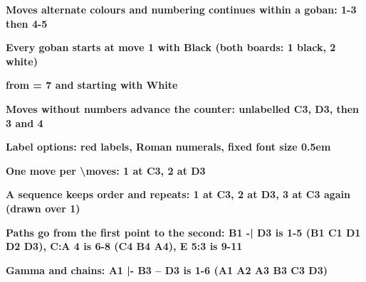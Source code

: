 \documentclass{article}
\newcommand\case[1]{\par\medskip\noindent\textbf{#1}\par\nopagebreak}
\begin{document}
\case{Moves alternate colours and numbering continues within a goban: 1-3 then 4-5}
\begin{goban}[5]\end{goban}

\case{Every goban starts at move 1 with Black (both boards: 1 black, 2 white)}
\begin{goban}[5]\end{goban}
\begin{goban}[5]\end{goban}

\case{from = 7 and starting with White}
\begin{goban}[5]\end{goban}

\case{Moves without numbers advance the counter: unlabelled C3, D3, then 3 and 4}
\begin{goban}[5]\end{goban}

\case{Label options: red labels, Roman numerals, fixed font size 0.5em}
\begin{goban}[5]\end{goban}
\begin{goban}[5]\end{goban}
\begin{goban}[5]\end{goban}

\case{One move per \textbackslash moves: 1 at C3, 2 at D3}
\begin{goban}[5]\end{goban}

\case{A sequence keeps order and repeats: 1 at C3, 2 at D3, 3 at C3 again (drawn over 1)}
\begin{goban}[5]\end{goban}

\case{Paths go from the first point to the second: B1 -| D3 is 1-5 (B1 C1 D1 D2 D3), C:A 4 is 6-8 (C4 B4 A4), E 5:3 is 9-11}
\begin{goban}[5]\end{goban}

\case{Gamma and chains: A1 |- B3 -- D3 is 1-6 (A1 A2 A3 B3 C3 D3)}
\begin{goban}[5]\end{goban}
\end{document}

